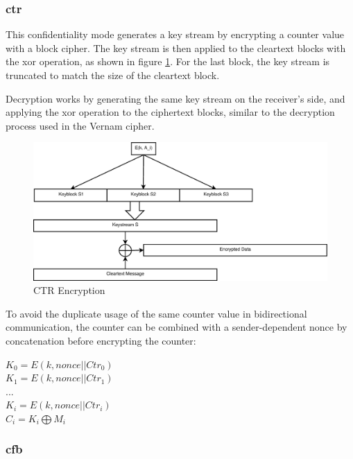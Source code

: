 \subsubsection{\gls{ctr}}

This confidentiality mode generates a key stream by encrypting a counter value with a block cipher. The key stream is then applied to the cleartext
blocks with the \gls{xor} operation, as shown in figure \ref{fig:ctr}. For the last block, the key stream is truncated to match the size of the cleartext block.

Decryption works by generating the same key stream on the receiver's side, and applying the \gls{xor} operation to the ciphertext blocks, similar to the
decryption process used in the Vernam cipher.

\begin{figure}
    \centering
    \includegraphics[width=1\textwidth]{figures/CTR.eps}
    \caption{CTR Encryption}
    \label{fig:ctr}
\end{figure}

To avoid the duplicate usage of the same counter value in bidirectional communication, the counter can be combined with a sender-dependent nonce by
concatenation before encrypting the counter:

\begin{center}
 $K_{0} = E(k, nonce || Ctr_0)$\\
 $K_{1} = E(k, nonce || Ctr_1)$\\
 ...\\
 $K_{i} = E(k, nonce || Ctr_i)$\\
 $C_i = K_i \bigoplus M_i$
\end{center}
 
\subsubsection{\gls{cfb}}


